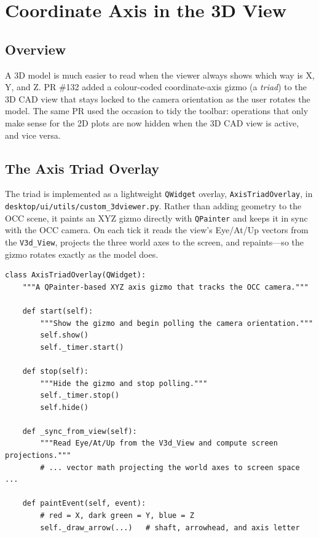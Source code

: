 \chapter{Coordinate Axis in the 3D View}
\label{ch:axis}

\section{Overview}
A 3D model is much easier to read when the viewer always shows which way is X, Y, and Z. PR
\#132 added a colour-coded coordinate-axis gizmo (a \emph{triad}) to the 3D CAD view that stays
locked to the camera orientation as the user rotates the model. The same PR used the occasion
to tidy the toolbar: operations that only make sense for the 2D plots are now hidden when the
3D CAD view is active, and vice versa.

\section{The Axis Triad Overlay}
The triad is implemented as a lightweight \texttt{QWidget} overlay,
\texttt{AxisTriadOverlay}, in \texttt{desktop/ui/utils/custom\_3dviewer.py}. Rather than adding
geometry to the OCC scene, it paints an XYZ gizmo directly with \texttt{QPainter} and keeps it
in sync with the OCC camera. On each tick it reads the view's Eye/At/Up vectors from the
\texttt{V3d\_View}, projects the three world axes to the screen, and repaints---so the gizmo
rotates exactly as the model does.

\begin{lstlisting}[caption={Camera-synchronised axis triad (\texttt{custom\_3dviewer.py}).},label={lst:triad}]
class AxisTriadOverlay(QWidget):
    """A QPainter-based XYZ axis gizmo that tracks the OCC camera."""

    def start(self):
        """Show the gizmo and begin polling the camera orientation."""
        self.show()
        self._timer.start()

    def stop(self):
        """Hide the gizmo and stop polling."""
        self._timer.stop()
        self.hide()

    def _sync_from_view(self):
        """Read Eye/At/Up from the V3d_View and compute screen projections."""
        # ... vector math projecting the world axes to screen space ...

    def paintEvent(self, event):
        # red = X, dark green = Y, blue = Z
        self._draw_arrow(...)   # shaft, arrowhead, and axis letter
\end{lstlisting}

